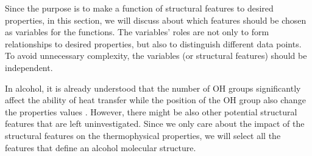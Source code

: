 Since the purpose is to make a function of structural features to desired 
properties, in this section, we will discuss about which features should be 
chosen as variables for the functions. The variables’ roles are not only to 
form relationships to desired properties, but also to distinguish different 
data points. To avoid unnecessary complexity, the variables (or structural 
features) should be independent.

In alcohol, it is already understood that the number of OH groups 
significantly affect the ability of heat transfer while the position of the OH 
group also change the properties values \cite{manjunatha_investigation_2017}. However, there 
might be also other potential structural features that are left uninvestigated. 
Since we only care about the impact of the structural features on the 
thermophysical properties, we will select all the features that define an 
alcohol molecular structure.
\newpage
